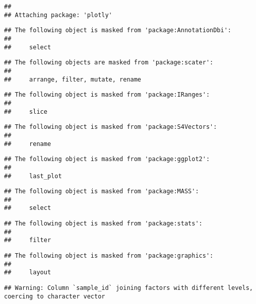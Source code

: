 \documentclass[]{article}
\begin{document}
\begin{verbatim}
## 
## Attaching package: 'plotly'
\end{verbatim}

\begin{verbatim}
## The following object is masked from 'package:AnnotationDbi':
## 
##     select
\end{verbatim}

\begin{verbatim}
## The following objects are masked from 'package:scater':
## 
##     arrange, filter, mutate, rename
\end{verbatim}

\begin{verbatim}
## The following object is masked from 'package:IRanges':
## 
##     slice
\end{verbatim}

\begin{verbatim}
## The following object is masked from 'package:S4Vectors':
## 
##     rename
\end{verbatim}

\begin{verbatim}
## The following object is masked from 'package:ggplot2':
## 
##     last_plot
\end{verbatim}

\begin{verbatim}
## The following object is masked from 'package:MASS':
## 
##     select
\end{verbatim}

\begin{verbatim}
## The following object is masked from 'package:stats':
## 
##     filter
\end{verbatim}

\begin{verbatim}
## The following object is masked from 'package:graphics':
## 
##     layout
\end{verbatim}

\begin{verbatim}
## Warning: Column `sample_id` joining factors with different levels, coercing to character vector
\end{verbatim}
\end{document}

